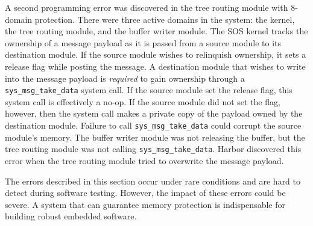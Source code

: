 %
A second programming error was discovered in the tree routing module with
8-domain protection.
%
There were three active domains in the system: the kernel, the tree routing
module, and the buffer writer module.
%
The SOS kernel tracks the ownership of a message payload as it is passed from a source module to its destination module.
%
If the source module wishes to relinquish ownership, it sets a release flag while posting the message.
%
A destination module that wishes to write into the message payload is
\emph{required} to gain ownership through a \verb+sys_msg_take_data+ system
call.  If the source module set the release flag, this system call is
effectively a no-op.  If the source module did not set the flag, however,
then the system call makes a private copy of the payload owned by the
destination module.
%
Failure to call \verb+sys_msg_take_data+ could corrupt the source module's
memory.
%
The buffer writer module was not releasing the buffer, but the tree routing
module was not calling \verb+sys_msg_take_data+.
%
Harbor discovered this error when the tree routing module tried to
overwrite the message payload.
%

The errors described in this section occur under rare conditions and
are hard to detect during software testing.
%
However, the impact of these errors could be severe.
%
A system that can guarantee memory protection is indispensable for
building robust embedded software.























